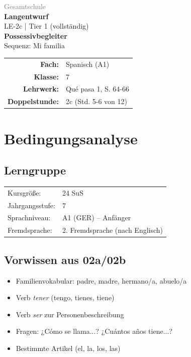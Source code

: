 \documentclass[11pt,a4paper]{article}
\newcommand{\fach}{Spanisch}
\newcommand{\jahrgangsstufe}{7}
\newcommand{\schulart}{Gesamtschule}
\newcommand{\stundenthema}{Possessivbegleiter}
\newcommand{\reihenthema}{Mi familia}
\newcommand{\stundennummer}{2c}
\newcommand{\lehrwerk}{Qué pasa 1}
\newcommand{\lehrwerkseite}{S. 64-66}
\newcommand{\lerngruppengroesse}{24}
\begin{document}
\begin{titlepage}
    \centering
    \vspace*{2cm}
    {\large\textcolor{gray}{\schulart}}\\[2cm]
    {\Huge\textcolor{fach}{\textbf{Langentwurf}}}\\[0.5cm]
    {\large LE-\stundennummer{} | Tier 1 (vollständig)}\\[2cm]
    {\LARGE\textbf{\stundenthema}}\\[0.5cm]
    {\large Sequenz: \reihenthema}\\[2cm]
    \begin{tabular}{rl}
        \textbf{Fach:} & \fach{} (A1) \\[0.3cm]
        \textbf{Klasse:} & \jahrgangsstufe \\[0.3cm]
        \textbf{Lehrwerk:} & \lehrwerk, \lehrwerkseite \\[0.3cm]
        \textbf{Doppelstunde:} & \stundennummer{} (Std. 5-6 von 12) \\[0.3cm]
    \end{tabular}
    \vfill
\end{titlepage}

\tableofcontents
\newpage

\section{Bedingungsanalyse}

\subsection{Lerngruppe}
\begin{tabular}{ll}
    Kursgröße: & \lerngruppengroesse{} SuS \\
    Jahrgangsstufe: & \jahrgangsstufe \\
    Sprachniveau: & A1 (GER) -- Anfänger \\
    Fremdsprache: & 2. Fremdsprache (nach Englisch) \\
\end{tabular}

\subsection{Vorwissen aus 02a/02b}
\begin{itemize}
    \item Familienvokabular: padre, madre, hermano/a, abuelo/a
    \item Verb \textit{tener} (tengo, tienes, tiene)
    \item Verb \textit{ser} zur Personenbeschreibung
    \item Fragen: ¿Cómo se llama...? ¿Cuántos años tiene...?
    \item Bestimmte Artikel (el, la, los, las)
\end{itemize}
\end{document}
